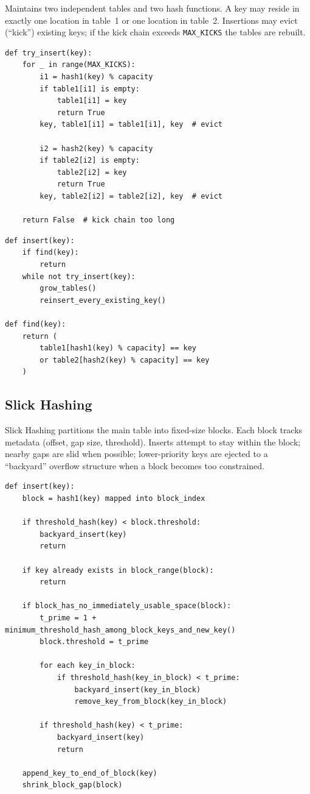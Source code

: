 \documentclass[11pt,a4paper]{article}
\begin{document}
Maintains two independent tables and two hash functions. A key may reside in exactly one
location in table~1 or one location in table~2. Insertions may evict (``kick'') existing
keys; if the kick chain exceeds \texttt{MAX\_KICKS} the tables are rebuilt.

\begin{lstlisting}[style=pseudocode, caption={Cuckoo Hashing -- try\_insert (single kick round)}]
def try_insert(key):
    for _ in range(MAX_KICKS):
        i1 = hash1(key) % capacity
        if table1[i1] is empty:
            table1[i1] = key
            return True
        key, table1[i1] = table1[i1], key  # evict

        i2 = hash2(key) % capacity
        if table2[i2] is empty:
            table2[i2] = key
            return True
        key, table2[i2] = table2[i2], key  # evict

    return False  # kick chain too long
\end{lstlisting}

\begin{lstlisting}[style=pseudocode, caption={Cuckoo Hashing -- insert and find}]
def insert(key):
    if find(key):
        return
    while not try_insert(key):
        grow_tables()
        reinsert_every_existing_key()

def find(key):
    return (
        table1[hash1(key) % capacity] == key
        or table2[hash2(key) % capacity] == key
    )
\end{lstlisting}

\subsection{Slick Hashing}

Slick Hashing partitions the main table into fixed-size blocks. Each block tracks metadata
(offset, gap size, threshold). Inserts attempt to stay within the block; nearby gaps are
slid when possible; lower-priority keys are ejected to a ``backyard'' overflow structure
when a block becomes too constrained.

\begin{lstlisting}[style=pseudocode, caption={Slick Hashing -- insert}]
def insert(key):
    block = hash1(key) mapped into block_index

    if threshold_hash(key) < block.threshold:
        backyard_insert(key)
        return

    if key already exists in block_range(block):
        return

    if block_has_no_immediately_usable_space(block):
        t_prime = 1 + minimum_threshold_hash_among_block_keys_and_new_key()
        block.threshold = t_prime

        for each key_in_block:
            if threshold_hash(key_in_block) < t_prime:
                backyard_insert(key_in_block)
                remove_key_from_block(key_in_block)

        if threshold_hash(key) < t_prime:
            backyard_insert(key)
            return

    append_key_to_end_of_block(key)
    shrink_block_gap(block)
\end{lstlisting}
\end{document}
